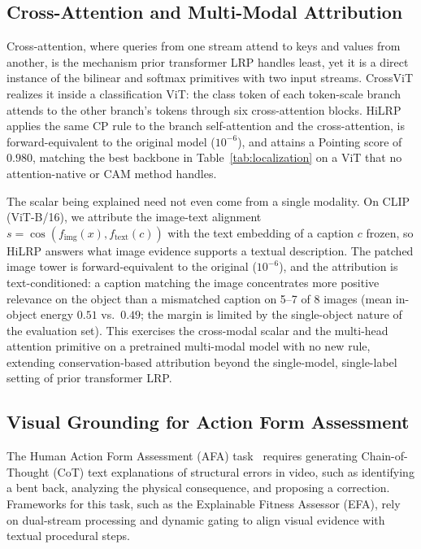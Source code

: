\documentclass[lettersize,journal]{IEEEtran}
\begin{document}
\subsection{Cross-Attention and Multi-Modal Attribution}
\label{sec:multimodal}
Cross-attention, where queries from one stream attend to keys and values from another, is the mechanism prior transformer LRP handles least, yet it is a direct instance of the bilinear and softmax primitives with two input streams. CrossViT realizes it inside a classification ViT: the class token of each token-scale branch attends to the other branch's tokens through six cross-attention blocks. HiLRP applies the same CP rule to the branch self-attention and the cross-attention, is forward-equivalent to the original model ($10^{-6}$), and attains a Pointing score of $0.980$, matching the best backbone in Table~\ref{tab:localization} on a ViT that no attention-native or CAM method handles.

The scalar being explained need not even come from a single modality. On CLIP (ViT-B/16), we attribute the image-text alignment $s=\cos(f_{\text{img}}(x), f_{\text{text}}(c))$ with the text embedding of a caption $c$ frozen, so HiLRP answers what image evidence supports a textual description. The patched image tower is forward-equivalent to the original ($10^{-6}$), and the attribution is text-conditioned: a caption matching the image concentrates more positive relevance on the object than a mismatched caption on 5--7 of 8 images (mean in-object energy $0.51$ vs.\ $0.49$; the margin is limited by the single-object nature of the evaluation set). This exercises the cross-modal scalar and the multi-head attention primitive on a pretrained multi-modal model with no new rule, extending conservation-based attribution beyond the single-model, single-label setting of prior transformer LRP.

\subsection{Visual Grounding for Action Form Assessment}
\label{sec:afa}
The Human Action Form Assessment (AFA) task~\cite{qi2026explainable} requires generating Chain-of-Thought (CoT) text explanations of structural errors in video, such as identifying a bent back, analyzing the physical consequence, and proposing a correction. Frameworks for this task, such as the Explainable Fitness Assessor (EFA), rely on dual-stream processing and dynamic gating to align visual evidence with textual procedural steps.
\end{document}

